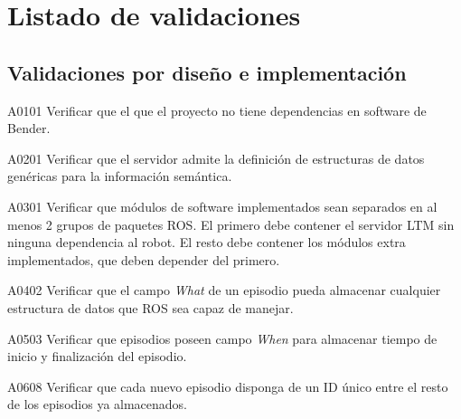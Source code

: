 \newpage
\section{Listado de validaciones}\label{appendix:validations}

\newenvironment{def-validacion}[3]
{
	\noindent{\bfseries Validación \Vlabel{#1}{#2}}
	\hfill\textit{(Derivado de }\RSlabel{#3})\\
}{}

\subsection{Validaciones por diseño e implementación}

\begin{def-validacion}{A}{01}{01}
	Verificar que el que el proyecto no tiene dependencias en software de Bender.
\end{def-validacion}

\begin{def-validacion}{A}{02}{01}
	Verificar que el servidor admite la definición de estructuras de datos genéricas para la información semántica.	
\end{def-validacion}

\begin{def-validacion}{A}{03}{01}
	Verificar que módulos de software implementados sean separados en al menos 2 grupos de paquetes ROS. El primero debe contener el servidor LTM sin ninguna dependencia al robot. El resto debe contener los módulos extra implementados, que deben depender del primero.	
\end{def-validacion}

\begin{def-validacion}{A}{04}{02}
Verificar que el campo \textit{What} de un episodio pueda almacenar cualquier estructura de datos que ROS sea capaz de manejar.	
\end{def-validacion}

\begin{def-validacion}{A}{05}{03}
Verificar que episodios poseen campo \textit{When} para almacenar tiempo de inicio y finalización del episodio.	
\end{def-validacion}

\begin{def-validacion}{A}{06}{08}
Verificar que cada nuevo episodio disponga de un ID único entre el resto de los episodios ya almacenados.	
\end{def-validacion}

